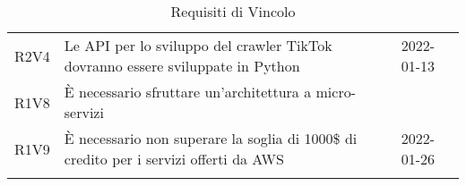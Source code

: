 \begin{longtable}{ m{}<{\centering}  m{}<{\centering}  m{}<{\centering}  m{}<{\centering}}
	R2V4 & Le API per lo sviluppo del crawler TikTok dovranno essere sviluppate in Python & \De & \Vi{} 2022-01-13 \\	
	 
	R1V8 & È necessario sfruttare un’architettura a micro-servizi & \Ob & \Ca \\	
	 
	R1V9 & È necessario non superare la soglia di 1000\$ di credito per i servizi offerti da AWS & \Ob & \Ve{} 2022-01-26 \\	
	
	\hiderowcolors \caption{Requisiti di Vincolo}
\end{longtable}

\pagebreak